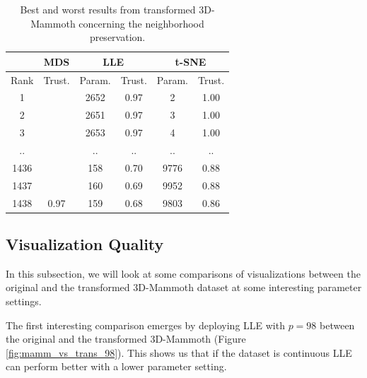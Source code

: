 \begin{table}[]
\centering
\begin{tabular}{|c|cl|cc|cc|}
\hline
 & \multicolumn{2}{c|}{{\color[HTML]{1B9E77} \textbf{MDS}}} & \multicolumn{2}{c|}{{\color[HTML]{D95F02} \textbf{LLE}}} & \multicolumn{2}{c|}{{\color[HTML]{7570B3} \textbf{t-SNE}}} \\ \hline
Rank & \multicolumn{2}{c|}{Trust.} & \multicolumn{1}{c|}{Param.} & Trust. & \multicolumn{1}{c|}{Param.} & Trust. \\ \hline
1 & \multicolumn{2}{c|}{} & \multicolumn{1}{c|}{2652} & 0.97 & \multicolumn{1}{c|}{2} & 1.00 \\ \cline{1-1} \cline{4-7} 
2 & \multicolumn{2}{c|}{} & \multicolumn{1}{c|}{2651} & 0.97 & \multicolumn{1}{c|}{3} & 1.00 \\ \cline{1-1} \cline{4-7} 
3 & \multicolumn{2}{c|}{} & \multicolumn{1}{c|}{2653} & 0.97 & \multicolumn{1}{c|}{4} & 1.00 \\ \cline{1-1} \cline{4-7} 
.. & \multicolumn{2}{c|}{} & \multicolumn{1}{c|}{..} & .. & \multicolumn{1}{c|}{..} & .. \\ \cline{1-1} \cline{4-7} 
1436 & \multicolumn{2}{c|}{} & \multicolumn{1}{c|}{158} & 0.70 & \multicolumn{1}{c|}{9776} & 0.88 \\ \cline{1-1} \cline{4-7} 
1437 & \multicolumn{2}{c|}{} & \multicolumn{1}{c|}{160} & 0.69 & \multicolumn{1}{c|}{9952} & 0.88 \\ \cline{1-1} \cline{4-7} 
1438 & \multicolumn{2}{c|}{\multirow{-7}{*}{0.97}} & \multicolumn{1}{c|}{159} & 0.68 & \multicolumn{1}{c|}{9803} & 0.86 \\ \hline
\end{tabular}
\caption[Transformed 3D-Mammoth Neighborhood Preservation]{Best and worst results from transformed 3D-Mammoth concerning the neighborhood preservation.}
\label{tab:best_worst_1nn_transMammoth}
\end{table}

\subsection{Visualization Quality} \label{subsec:visqual_transmamoth}

In this subsection, we will look at some comparisons of visualizations between the original and the transformed 3D-Mammoth dataset at some interesting parameter settings.

The first interesting comparison emerges by deploying LLE with $p=98$ between the original and the transformed 3D-Mammoth (Figure \ref{fig:mamm_vs_trans_98}). This shows us that if the dataset is continuous LLE can perform better with a lower parameter setting.

